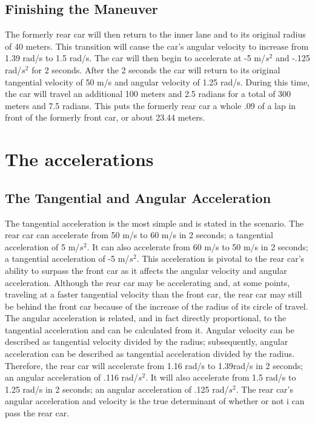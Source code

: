 \documentclass{article}
\begin{document}
\subsection{Finishing the Maneuver}
The formerly rear car will then return to the inner lane and to its original radius of 40 meters. This transition will cause the car's angular velocity to increase from 1.39 rad/s to 1.5 rad/s. The car will then begin to accelerate at -5 m/${s^2}$ and -.125 rad/${s^2}$ for 2 seconds. After the 2 seconds the car will return to its original tangential velocity of 50 m/s and angular velocity of 1.25 rad/s. During this time, the car will travel an additional 100 meters and 2.5 radians for a total of 300 meters and 7.5 radians. This puts the formerly rear car a whole .09 of a lap in front of the formerly front car, or about 23.44 meters.

\section{The accelerations}
\subsection{The Tangential and Angular Acceleration}
The tangential acceleration is the most simple and is stated in the scenario. The rear car can accelerate from 50 m/s to 60 m/s in 2 seconds; a tangential acceleration of 5 m/${s^2}$. It can also accelerate from 60 m/s to 50 m/s in 2 seconds; a tangential acceleration of -5 m/${s^2}$. This acceleration is pivotal to the rear car's ability to surpass the front car as it affects the angular velocity and angular acceleration. Although the rear car may be accelerating and, at some points, traveling at a faster tangential velocity than the front car, the rear car may still be behind the front car because of the increase of the radius of its circle of travel. The angular acceleration is related, and in fact directly proportional, to the tangential acceleration and can be calculated from it. Angular velocity can be described as tangential velocity divided by the radius; subsequently, angular acceleration can be described as tangential acceleration divided by the radius. Therefore, the rear car will accelerate from 1.16 rad/s to 1.39rad/s in 2 seconds; an angular acceleration of .116 rad/${s^2}$. It will also accelerate from 1.5 rad/s to 1.25 rad/s in 2 seconds; an angular acceleration of .125 rad/${s^2}$. The rear car's angular acceleration and velocity is the true determinant of whether or not i can pass the rear car.
\end{document}
